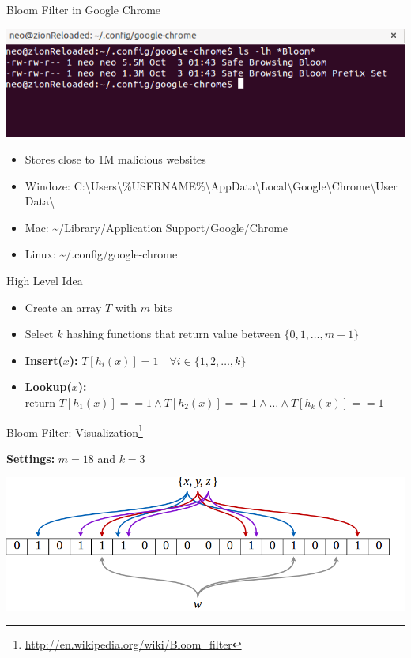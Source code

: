 \documentclass{beamer}
\begin{document}
\begin{frame}{Bloom Filter in Google Chrome}
    \begin{center}
        \includegraphics[scale=0.5]{bloomFilterGoogleChrome.png}
    \end{center}
    \begin{itemize}
        \item Stores close to 1M malicious websites
        \item Windoze:  {\scriptsize C:\textbackslash Users\textbackslash\%USERNAME\%\textbackslash AppData\textbackslash Local\textbackslash Google\textbackslash Chrome\textbackslash User Data\textbackslash}
        \item Mac: \textasciitilde/Library/Application Support/Google/Chrome
        \item Linux: \textasciitilde/.config/google-chrome
    \end{itemize}
\end{frame}

\begin{frame}{High Level Idea}
    \begin{itemize}
        \item Create an array $T$ with $m$ bits
        \item Select $k$ hashing functions that return value between $\{0, 1, \ldots, m-1\}$
        \item {\bf Insert($x$):} $T[h_i(x)] = 1 \quad \forall i \in \{1, 2, \ldots, k\}$
        \item {\bf Lookup($x$):} \\ return $T[h_1(x)] == 1 \land T[h_2(x)] == 1 \land \ldots \land T[h_k(x)] == 1$
    \end{itemize}
\end{frame}

\begin{frame}{Bloom Filter: Visualization\footnote{\url{http://en.wikipedia.org/wiki/Bloom_filter}}}

    {\bf Settings:} $m=18$ and $k=3$
    \begin{center}
        \includegraphics[scale=0.36]{bloomFilterEg.png}
    \end{center}
\end{frame}
\end{document}
